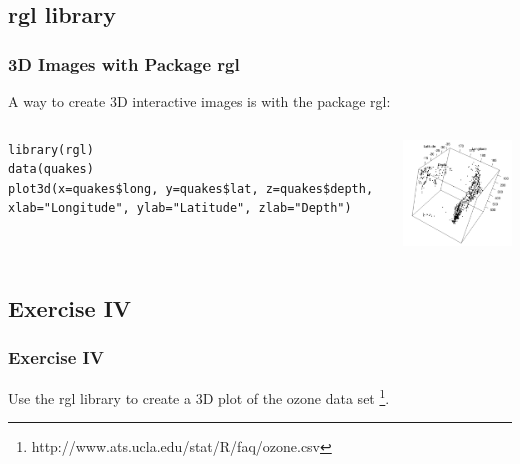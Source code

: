 \subsection{\ttfamily rgl \normalfont library} 
\begin{frame}[fragile]
\frametitle{3D Images with Package \ttfamily rgl \normalfont}

A way to create 3D interactive images is with the package \ttfamily rgl: \normalfont 

    \begin{columns}
\begin{lstlisting}
library(rgl)
data(quakes)
plot3d(x=quakes$long, y=quakes$lat, z=quakes$depth, xlab="Longitude", ylab="Latitude", zlab="Depth")
\end{lstlisting}

       \begin{center}
\includegraphics[width = 55mm]{images/Fiji_RGL}
\end{center}
\end{columns}
\end{frame}

\subsection{Exercise IV}
\begin{frame}
	\frametitle{Exercise IV}
	Use the \ttfamily rgl \normalfont library to create a 3D plot of the \ttfamily ozone \normalfont data set \footnote{\ttfamily http://www.ats.ucla.edu/stat/R/faq/ozone.csv\normalfont}.
\end{frame}
